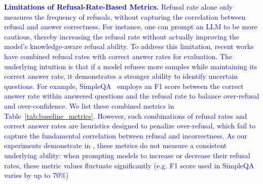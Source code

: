 \documentclass{article} %
\theoremstyle{definition}
\newcommand{\wigglyblue}[1]{\textcolor{blue}{#1}}
\begin{document}
\noindent\wigglyblue{\textbf{Limitations of Refusal-Rate-Based Metrics.} 
Refusal rate alone only measures the frequency of refusals, without capturing the correlation between refusal and answer correctness.
For instance, one can prompt an LLM to be more cautious, thereby increasing the refusal rate without actually improving the model's knowledge-aware refusal ability.
To address this limitation, recent works have combined refusal rates with correct answer rates for evaluation.
The underlying intuition is that if a model refuses more samples while maintaining its correct answer rate, it demonstrates a stronger ability to identify uncertain questions.
For example, SimpleQA~\citep{wei2024measuringshortformfactualitylarge} employs an F1 score between the correct answer rate within answered questions and the refusal rate to balance over-refusal and over-confidence. 
We list these combined metrics in Table~\ref{tab:baseline_metrics}.
However, such combinations of refusal rates and correct answer rates are heuristics designed to penalize over-refusal, which fail to capture the fundamental correlation between refusal and incorrectness. 
As our experiments demonstrate in \Secref{sec:refusal_index_validation}, these metrics do not measure a consistent underlying ability: when prompting models to increase or decrease their refusal rates, these metric values fluctuate significantly (e.g. F1 score used in SimpleQA varies by up to 70\%)}
\end{document}
